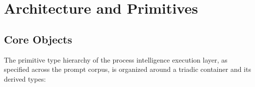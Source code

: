 
\section{Architecture and Primitives}
\label{sec:prompts-architecture}

\subsection{Core Objects}
\label{sec:prompts-architecture-objects}

The primitive type hierarchy of the process intelligence execution layer, as specified
across the prompt corpus, is organized around a triadic container and its derived
types:

